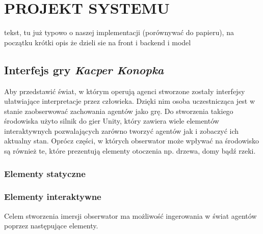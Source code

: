 \chapter{PROJEKT SYSTEMU}

tekst, tu już typowo o naszej implementacji (porównywać do papieru), na początku krótki opis że dzieli sie na front i backend i model


\section{Interfejs gry \textit{Kacper Konopka}}

Aby przedstawić świat, w którym operują agenci stworzone zostały interfejsy ułatwiające interpretacje przez człowieka. Dzięki nim osoba uczestnicząca jest w stanie zaobserwować zachowania agentów jako grę. Do stworzenia takiego środowiska użyto silnik do gier Unity, który zawiera wiele elementów interaktywnych pozwalających zarówno tworzyć agentów jak i zobaczyć ich aktualny stan. Oprócz części, w których obserwator może wpływać na środowisko są również te, które prezentują elementy otoczenia np. drzewa, domy bądź rzeki.

\subsection{Elementy statyczne}

\subsection{Elementy interaktywne}
Celem stworzenia imersji obserwator ma możliwość ingerowania w świat agentów poprzez następujące elementy.
